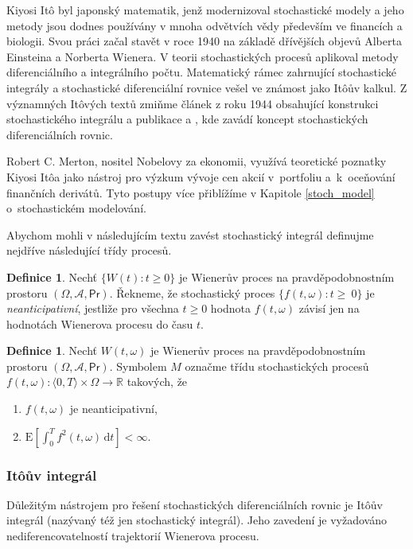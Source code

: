 \documentclass[a4paper,12pt]{report}
\theoremstyle{definition} \newtheorem{definice}[veta]{Definice}
\theoremstyle{remark}
\begin{document}
Kiyosi It\^o byl japonský matematik, jenž modernizoval stochastické modely a jeho metody jsou dodnes používány v mnoha odvětvích vědy především ve financích a biologii.
Svou práci začal stavět v roce 1940 na základě dřívějších objevů Alberta Einsteina a Norberta Wienera.
V teorii stochastických procesů aplikoval metody diferenciálního a integrálního počtu.
Matematický rámec zahrnující stochastické integrály a stochastické diferenciální rovnice vešel ve známost jako It\^oův kalkul.
Z významných It\^ových textů zmiňme 
článek \cite{ito1944} z roku 1944 obsahující konstrukci stochastického integrálu
a publikace \cite{ito1946} a
\cite{ito1951stochastic}, kde zavádí koncept stochastických diferenciálních rovnic.

Robert C. Merton, nositel Nobelovy za ekonomii, využívá teoretické poznatky Kiyosi It\^oa jako nástroj pro výzkum vývoje cen akcií v~portfoliu a~k~oceňování finančních derivátů.
Tyto postupy více přiblížíme v Kapitole \ref{stoch_model} o~stochastickém modelování.

Abychom mohli v následujícím textu zavést stochastický integrál definujme nejdříve následující třídy procesů.
\begin{definice}
Nechť $\{W(t):t\ge0\}$ je Wienerův proces na pravděpodobnostním prostoru $(\Omega,\mathcal{A},\mathsf{Pr})$.
Řekneme, že stochastický proces $\{f(t,\omega):t\ge~0\}$ je \textit{neanticipativní}, jestliže pro všechna $t\ge0$ hodnota $f(t,\omega)$ závisí jen na hodnotách Wienerova procesu do času $t$.
\end{definice}

\begin{definice}\label{M}
Nechť $W(t,\omega)$ je Wienerův proces na pravděpodobnostním prostoru $(\Omega,\mathcal{A},\mathsf{Pr})$.
Symbolem $M$ označme třídu stochastických procesů \linebreak$f(t,\omega):\langle0,T\rangle\times\Omega\to\mathbb R$ takových, že
\begin{enumerate}
\item $f(t,\omega)$ je neanticipativní, 
\item $\text{E}\left[\int_0^Tf^2(t,\omega)\,\mathrm{d}t\right]<\infty.$ 
\end{enumerate}
\end{definice}

\subsubsection{It\^oův integrál}\label{Ito_integral}
Důležitým nástrojem pro řešení stochastických diferenciálních rovnic je It\^oův integrál (nazývaný též jen stochastický integrál).
Jeho zavedení je vyžadováno nediferencovatelností trajektorií Wienerova procesu.
\end{document}
